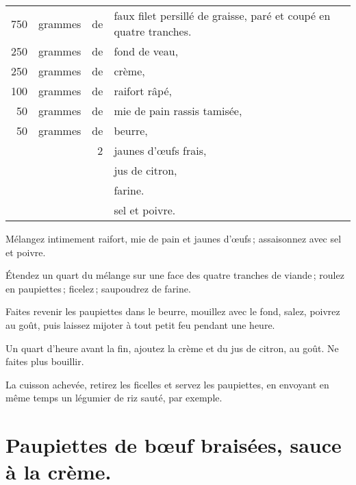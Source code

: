\footnotesize
\begin{longtable}{rrrp{16em}}
    750 & grammes & de & faux filet persillé de graisse, paré et coupé en quatre tranches.                \\
    250 & grammes & de & fond de veau,                                                                    \\
    250 & grammes & de & crème,                                                                           \\
    100 & grammes & de & raifort râpé,                                                                    \\
     50 & grammes & de & mie de pain rassis tamisée,                                                      \\
     50 & grammes & de & beurre,                                                                          \\
        &         &  2 & jaunes d'œufs frais,                                                             \\
        &         &    & jus de citron,                                                                   \\
        &         &    & farine.                                                                          \\
        &         &    & sel et poivre.                                                                   \\
\end{longtable}
\normalsize

Mélangez intimement raifort, mie de pain et jaunes d'œufs ; assaisonnez avec
sel et poivre.

Étendez un quart du mélange sur une face des quatre tranches de viande ; roulez
en paupiettes ; ficelez ; saupoudrez de farine.

Faites revenir les paupiettes dans le beurre, mouillez avec le fond, salez,
poivrez au goût, puis laissez mijoter à tout petit feu pendant une heure.

Un quart d'heure avant la fin, ajoutez la crème et du jus de citron, au goût.
Ne faites plus bouillir.

La cuisson achevée, retirez les ficelles et servez les paupiettes, en envoyant
en même temps un légumier de riz sauté, par exemple.

\section*{\centering Paupiettes de bœuf braisées, sauce à la crème.}
{}

